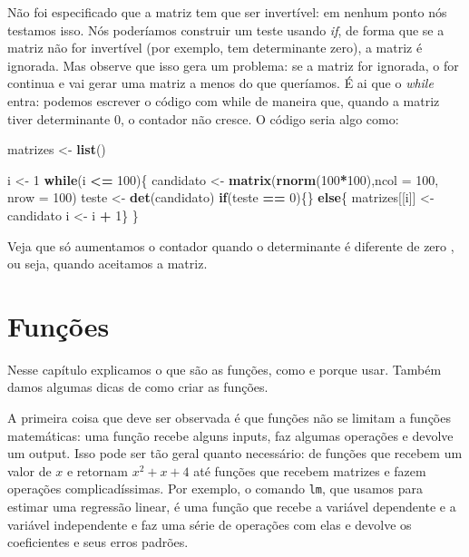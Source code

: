 \documentclass[
]{book}
\newenvironment{Shaded}{\begin{snugshade}}{\end{snugshade}}
\newcommand{\ControlFlowTok}[1]{\textcolor[rgb]{0.13,0.29,0.53}{\textbf{#1}}}
\newcommand{\DataTypeTok}[1]{\textcolor[rgb]{0.13,0.29,0.53}{#1}}
\newcommand{\DecValTok}[1]{\textcolor[rgb]{0.00,0.00,0.81}{#1}}
\newcommand{\KeywordTok}[1]{\textcolor[rgb]{0.13,0.29,0.53}{\textbf{#1}}}
\newcommand{\NormalTok}[1]{#1}
\newcommand{\OperatorTok}[1]{\textcolor[rgb]{0.81,0.36,0.00}{\textbf{#1}}}
\newcommand{\StringTok}[1]{\textcolor[rgb]{0.31,0.60,0.02}{#1}}
\begin{document}
Não foi especificado que a matriz tem que ser invertível: em nenhum ponto nós testamos isso. Nós poderíamos construir um teste usando \emph{if}, de forma que se a matriz não for invertível (por exemplo, tem determinante zero), a matriz é ignorada. Mas observe que isso gera um problema: se a matriz for ignorada, o for continua e vai gerar uma matriz a menos do que queríamos. É ai que o \emph{while} entra: podemos escrever o código com while de maneira que, quando a matriz tiver determinante 0, o contador não cresce. O código seria algo como:

\begin{Shaded}
\begin{Highlighting}[]
\NormalTok{ matrizes \textless{}{-}}\StringTok{ }\KeywordTok{list}\NormalTok{()}
 
\NormalTok{ i \textless{}{-}}\StringTok{ }\DecValTok{1}
 \ControlFlowTok{while}\NormalTok{(i }\OperatorTok{\textless{}=}\StringTok{ }\DecValTok{100}\NormalTok{)\{}
\NormalTok{ candidato \textless{}{-}}\StringTok{ }\KeywordTok{matrix}\NormalTok{(}\KeywordTok{rnorm}\NormalTok{(}\DecValTok{100}\OperatorTok{*}\DecValTok{100}\NormalTok{),}\DataTypeTok{ncol =} \DecValTok{100}\NormalTok{, }\DataTypeTok{nrow =} \DecValTok{100}\NormalTok{)}
\NormalTok{ teste \textless{}{-}}\StringTok{ }\KeywordTok{det}\NormalTok{(candidato)}
 \ControlFlowTok{if}\NormalTok{(teste }\OperatorTok{==}\StringTok{ }\DecValTok{0}\NormalTok{)\{\} }\ControlFlowTok{else}\NormalTok{\{}
\NormalTok{ matrizes[[i]] \textless{}{-}}\StringTok{ }\NormalTok{candidato}
\NormalTok{ i \textless{}{-}}\StringTok{ }\NormalTok{i }\OperatorTok{+}\StringTok{ }\DecValTok{1}\NormalTok{\}}
\NormalTok{ \}}
\end{Highlighting}
\end{Shaded}

Veja que só aumentamos o contador quando o determinante é diferente de zero , ou seja, quando aceitamos a matriz.

\hypertarget{funuxe7uxf5es}{%
\chapter{Funções}\label{funuxe7uxf5es}}

Nesse capítulo explicamos o que são as funções, como e porque usar. Também damos algumas dicas de como criar as funções.

A primeira coisa que deve ser observada é que funções não se limitam a funções matemáticas: uma função recebe alguns inputs, faz algumas operações e devolve um output. Isso pode ser tão geral quanto necessário: de funções que recebem um valor de \(x\) e retornam \(x^2+x+4\) até funções que recebem matrizes e fazem operações complicadíssimas. Por exemplo, o comando \texttt{lm}, que usamos para estimar uma regressão linear, é uma função que recebe a variável dependente e a variável independente e faz uma série de operações com elas e devolve os coeficientes e seus erros padrões.
\end{document}
